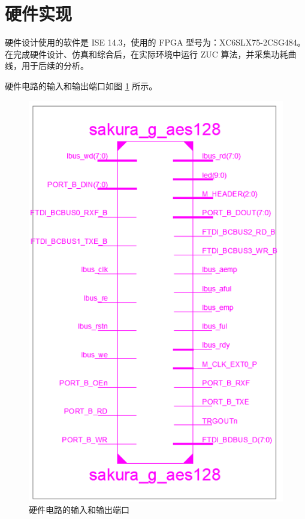 \section{硬件实现}

硬件设计使用的软件是 ISE 14.3，使用的 FPGA 型号为：XC6SLX75-2CSG484。在完成硬件设计、仿真和综合后，在实际环境中运行 ZUC 算法，并采集功耗曲线，用于后续的分析。


\newpage

硬件电路的输入和输出端口如图 \ref{fig:circuit_io} 所示。

\begin{figure}[htbp]
    \centering
    \includegraphics[height=.6\textheight]{../images/circuit_io.png}
    \caption{硬件电路的输入和输出端口}
    \label{fig:circuit_io}
\end{figure}

